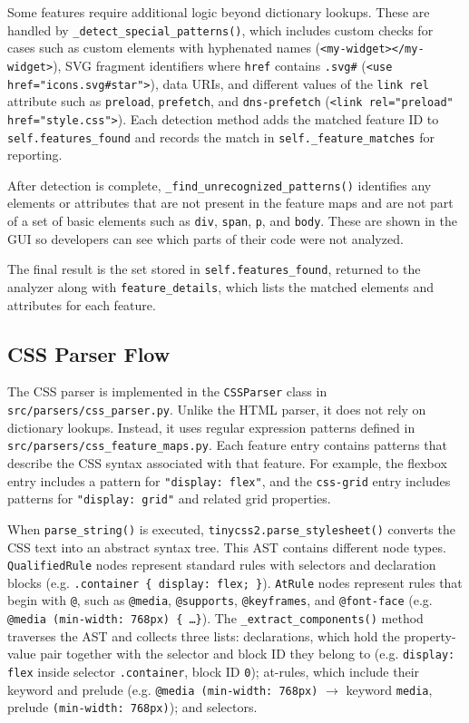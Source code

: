 Some features require additional logic beyond dictionary lookups. These are handled by \texttt{\_detect\_special\_patterns()}, which includes custom checks for cases such as custom elements with hyphenated names (\texttt{<my-widget></my-widget>}), SVG fragment identifiers where \texttt{href} contains \texttt{.svg\#} (\texttt{<use href="icons.svg\#star">}), data URIs, and different values of the \texttt{link rel} attribute such as \texttt{preload}, \texttt{prefetch}, and \texttt{dns-prefetch} (\texttt{<link rel="preload" href="style.css">}). Each detection method adds the matched feature ID to \texttt{self.features\_found} and records the match in \texttt{self.\_feature\_matches} for reporting.

After detection is complete, \texttt{\_find\_unrecognized\_patterns()} identifies any elements or attributes that are not present in the feature maps and are not part of a set of basic elements such as \texttt{div}, \texttt{span}, \texttt{p}, and \texttt{body}. These are shown in the GUI so developers can see which parts of their code were not analyzed.

The final result is the set stored in \texttt{self.features\_found}, returned to the analyzer along with \texttt{feature\_details}, which lists the matched elements and attributes for each feature.

\subsection{CSS Parser Flow}

The CSS parser is implemented in the \texttt{CSSParser} class in \texttt{src/parsers/css\_parser.py}. Unlike the HTML parser, it does not rely on dictionary lookups. Instead, it uses regular expression patterns defined in \texttt{src/parsers/css\_feature\_maps.py}. Each feature entry contains patterns that describe the CSS syntax associated with that feature. For example, the flexbox entry includes a pattern for \texttt{"display: flex"}, and the \texttt{css-grid} entry includes patterns for \texttt{"display: grid"} and related grid properties.

When \texttt{parse\_string()} is executed, \texttt{tinycss2.parse\_stylesheet()} converts the CSS text into an abstract syntax tree. This AST contains different node types. \texttt{QualifiedRule} nodes represent standard rules with selectors and declaration blocks (e.g. \texttt{.container \{ display: flex; \}}). \texttt{AtRule} nodes represent rules that begin with \texttt{@}, such as \texttt{@media}, \texttt{@supports}, \texttt{@keyframes}, and \texttt{@font-face} (e.g. \texttt{@media (min-width: 768px) \{ \ldots \}}). The \texttt{\_extract\_components()} method traverses the AST and collects three lists: declarations, which hold the property-value pair together with the selector and block ID they belong to (e.g. \texttt{display: flex} inside selector \texttt{.container}, block ID \texttt{0}); at-rules, which include their keyword and prelude (e.g. \texttt{@media (min-width: 768px)} $\to$ keyword \texttt{media}, prelude \texttt{(min-width: 768px)}); and selectors.

